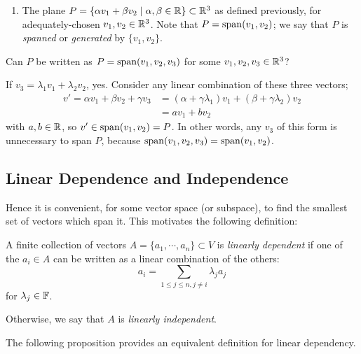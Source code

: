 \begin{enumerate}[Ex. A)]
\item The plane $P=\{\alpha v_1 + \beta v_2 \mid \alpha,\beta\in\mathbb{R}\}\subset\mathbb{R}^3$ as defined previously, for adequately-chosen $v_1,v_2\in\mathbb{R}^3$. Note that $P=\operatorname{span}(v_1,v_2)$; we say that $P$ is \emph{spanned} or \emph{generated} by $\{v_1,v_2\}$.
\end{enumerate}

\begin{question}
  Can $P$ be written as $P=\operatorname{span}(v_1,v_2,v_3)$ for some $v_1,v_2,v_3\in\mathbb{R}^3$?
\end{question}
\begin{answer}
  If $v_3=\lambda_1 v_1 + \lambda_2 v_2$, yes. Consider any linear combination of these three vectors;
  \begin{align*}
    v'=\alpha v_1 + \beta v_2 + \gamma v_3 &= (\alpha + \gamma\lambda_1)v_1 + (\beta + \gamma\lambda_2)v_2\\
    &= a v_1 + b v_2
  \end{align*}
  with $a,b\in\mathbb{R}$, so $v'\in\operatorname{span}(v_1,v_2)=P$. In other words, any $v_3$ of this form is unnecessary to span $P$, because $\operatorname{span}(v_1,v_2,v_3)=\operatorname{span}(v_1,v_2)$.
\end{answer}

\subsection{Linear Dependence and Independence}

Hence it is convenient, for some vector space (or subspace), to find the smallest set of vectors which span it. This motivates the following definition:

\begin{definition}
  A finite collection of vectors $A=\{a_1,\cdots,a_n\}\subset V$ is \emph{linearly dependent} if one of the $a_i\in A$ can be written as a linear combination of the others:
  \[
    a_i = \sum_{1\leq j \leq n, j\neq i} \lambda_j a_j
  \]
  for $\lambda_j\in\mathbb{F}$.

  Otherwise, we say that $A$ is \emph{linearly independent}.
\end{definition}


The following proposition provides an equivalent definition for linear dependency.

